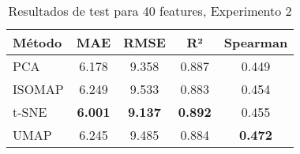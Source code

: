 \begin{table}[h]
\centering
\begin{tabular}{lcccc}
\toprule
\textbf{Método} & \textbf{MAE} & \textbf{RMSE} & \textbf{R²} & \textbf{Spearman} \\
\midrule
PCA & 6.178 & 9.358 & 0.887 & 0.449 \\
ISOMAP & 6.249 & 9.533 & 0.883 & 0.454 \\
t-SNE & \textbf{6.001} & \textbf{9.137} & \textbf{0.892} & 0.455 \\
UMAP & 6.245 & 9.485 & 0.884 & \textbf{0.472} \\
\bottomrule
\end{tabular}
\caption{Resultados de test para 40 features, Experimento 2}
\label{tab:test_results_40feat_exp2}
\end{table}